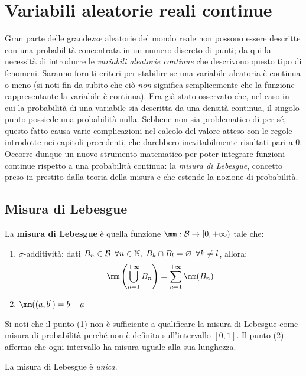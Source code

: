 \section{Variabili aleatorie reali continue}
Gran parte delle grandezze aleatorie del mondo reale non possono essere descritte con una probabilità concentrata in un numero discreto di punti; da qui la necessità di introdurre le \emph{variabili aleatorie continue} che descrivono questo tipo di fenomeni.
Saranno forniti criteri per stabilire se una variabile aleatoria è continua o meno (si noti fin da subito che ciò \emph{non} significa semplicemente che la funzione rappresentante la variabile è continua).
Era già stato osservato che, nel caso in cui la probabilità di una variabile sia descritta da una densità continua, il singolo punto possiede una probabilità nulla.
Sebbene non sia problematico di per sé, questo fatto causa varie complicazioni nel calcolo del valore atteso con le regole introdotte nei capitoli precedenti, che darebbero inevitabilmente risultati pari a $0$.
Occorre dunque un nuovo strumento matematico per poter integrare funzioni continue rispetto a una probabilità continua: la \emph{misura di Lebesgue}, concetto preso in prestito dalla teoria della misura e che estende la nozione di probabilità.


\subsection{Misura di Lebesgue}

\begin{defn}
  La \textbf{misura di Lebesgue} è quella funzione $\mm:\Bc \to [0, +\infty)$ tale che:
  \begin{enumerate}
    \item $\sigma$-additività: dati $B_n \in \mathcal B \enspace \forall n \in \mathbb N, \; B_k \cap B_l = \varnothing \enspace \forall k \neq l$, allora:
      $$\mm\left( \bigcup\limits_{n=1}^{{+\infty}} B_n \right) = \sum\limits_{n=1}^{{+\infty}} \mm(B_n)$$
    \item $\mm((a,b]) = b-a$
  \end{enumerate}
\end{defn}
Si noti che il punto (1) non è sufficiente a qualificare la misura di Lebesgue come misura di probabilità perché non è definita sull'intervallo $[0,1]$. Il punto (2) afferma che ogni intervallo ha misura uguale alla sua lunghezza.

\medskip
\begin{teo}
  La misura di Lebesgue è \textit{unica}.
\end{teo}

